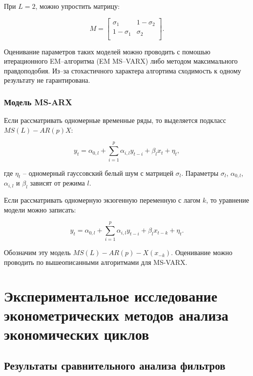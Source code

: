 \documentclass[a4paper,14pt]{extreport}
\begin{document}
	При $L=2$, можно упростить матрицу:
	
	\begin{equation}
	\label{eq:M_simplified}
	M=
	\left[ {\begin{array}{cc}
		\sigma_{1} & 1-\sigma_{2} \\
		1-\sigma_{1} & \sigma_{2} \\
		\end{array} } \right].
	\end{equation}
	
	Оценивание параметров таких моделей можно проводить с помошью итерационного EM–алгоритма (EM MS–VARX) \cite{malNovopMSVARX} либо методом максимального правдоподобия. Из–за стохастичного характера алгортима сходимость к одному результату не гарантирована.
	
	
	\subsection{Модель MS-ARX}
	
	Если рассматривать одномерные временные ряды, то выделяется подкласс $MS(L)-AR(p)X$:
	
	\begin{equation}  
	y_{t} = \alpha_{0,l} + \sum_{i=1}^{p} \alpha_{i,l} y_{t-i} + \beta_{l} x_{t} + \eta_{t},
	\end{equation}
	
	где $\eta_{t}$ – одномерный гауссовский белый шум с матрицей $\sigma_{l}$. Параметры $\sigma_{l}$, $\alpha_{0,l}$, $\alpha_{i,l}$ и $\beta_{l}$ зависят от режима $l$.
	
	Если рассматривать одномерную экзогенную переменную с лагом $k$, то уравнение модели можно записать:
	
	\begin{equation}  
	\label{eq:gen-msarx}
	y_{t} = \alpha_{0,l} + \sum_{i=1}^{p} \alpha_{i,l} y_{t-i} + \beta_{l} x_{t-k} + \eta_{t}.
	\end{equation}
	
	Обозначим эту модель $MS(L)-AR(p)-X({x}_{-k})$. Оценивание можно проводить по вышеописанными алгоритмами для MS-VARX.
	
	
	\chapter{Экспериментальное исследование эконометрических методов анализа экономических циклов}
	
	\section{Результаты сравнительного анализа фильтров}
	
\end{document}
